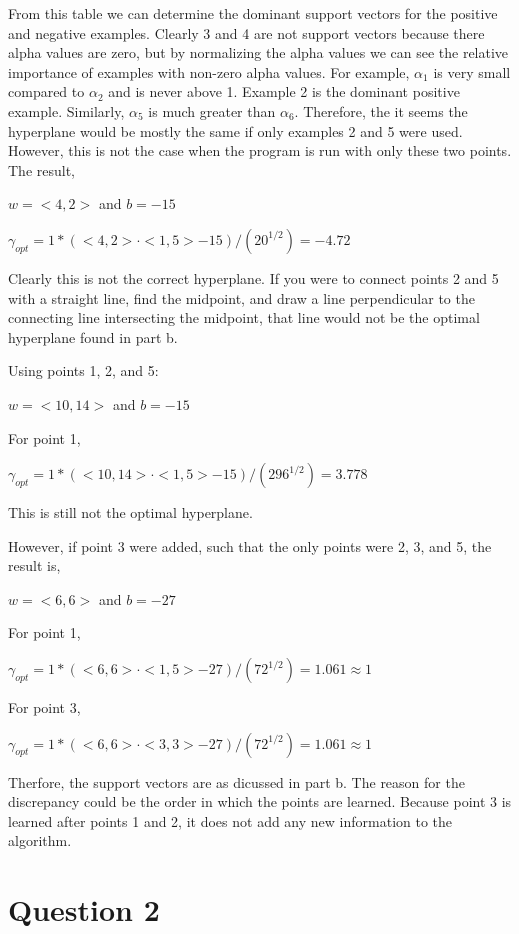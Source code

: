 \documentclass[12pt]{article}
\begin{document}
\begin{enumerate}
From this table we can determine the dominant support vectors for the positive and negative examples. Clearly 3 and 4 are not support vectors because there alpha values are zero, but by normalizing the alpha values we can see the relative importance of examples with non-zero alpha values. For example, $\alpha_1$ is very small compared to $\alpha_2$ and is never above 1. Example 2 is the dominant positive example. Similarly, $\alpha_5$ is much greater than $\alpha_6$. Therefore, the it seems the hyperplane would be mostly the same if only examples 2 and 5 were used. However, this is not the case when the program is run with only these two points. The result,

$w = <4,2>$ and $b = -15$

$\gamma_{opt} = 1*(<4,2> \cdot <1,5> -15)/(20^{1/2}) = -4.72$

Clearly this is not the correct hyperplane. If you were to connect points 2 and 5 with a straight line, find the midpoint, and draw a line perpendicular to the connecting line intersecting the midpoint, that line would not be the optimal hyperplane found in part b.

Using points 1, 2, and 5:

$w = <10,14>$ and $b = -15$

For point 1,

$\gamma_{opt} = 1*(<10,14> \cdot <1,5> -15)/(296^{1/2}) = 3.778$

This is still not the optimal hyperplane.

However, if point 3 were added, such that the only points were 2, 3, and 5, the result is,

$w = <6,6>$ and $b = -27$

For point 1,

$\gamma_{opt} = 1*(<6,6> \cdot <1,5> -27)/(72^{1/2}) = 1.061 \approx 1$

For point 3,

$\gamma_{opt} = 1*(<6,6> \cdot <3,3> -27)/(72^{1/2}) = 1.061 \approx 1$

Therfore, the support vectors are as dicussed in part b. The reason for the discrepancy could be the order in which the points are learned. Because point 3 is learned after points 1 and 2, it does not add any new information to the algorithm. 


\end{enumerate}

\section{Question 2}
\end{document}
